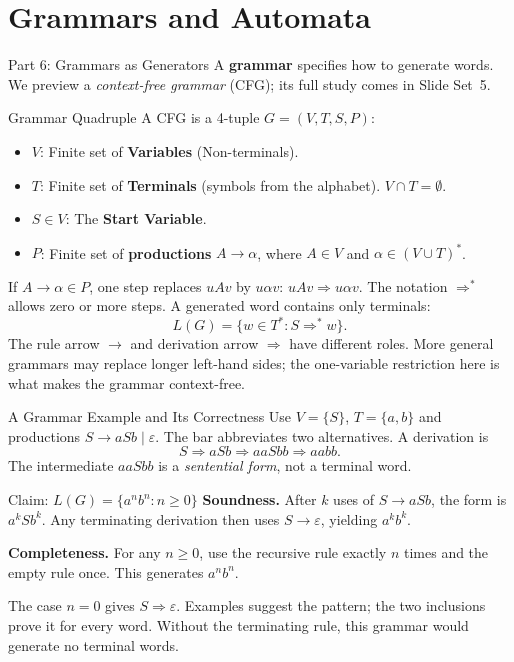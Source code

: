 \documentclass[10pt]{beamer}
\begin{document}
\section{Grammars and Automata}

\begin{frame}{Part 6: Grammars as Generators}
  \small
  A \textbf{grammar} specifies how to generate words. We preview a
  \emph{context-free grammar} (CFG); its full study comes in Slide Set~5.
  \pause
  \begin{block}{Grammar Quadruple}
    A CFG is a 4-tuple $G=(V,T,S,P)$:
    \begin{itemize}
        \item $V$: Finite set of \textbf{Variables} (Non-terminals).
        \item $T$: Finite set of \textbf{Terminals} (symbols from the alphabet). $V \cap T = \emptyset$.
        \item $S \in V$: The \textbf{Start Variable}.
        \item $P$: Finite set of \textbf{productions} $A\to\alpha$, where
          $A\in V$ and $\alpha\in(V\cup T)^*$.
    \end{itemize}
  \end{block}
  \pause
  If $A\to\alpha\in P$, one step replaces $uAv$ by $u\alpha v$:
  $uAv\Rightarrow u\alpha v$. The notation $\Rightarrow^*$ allows zero
  or more steps. A generated word contains only terminals:
  \[
    L(G)=\{w\in T^*:S\Rightarrow^*w\}.
  \]
  The rule arrow $\to$ and derivation arrow $\Rightarrow$ have different roles.
  More general grammars may replace longer left-hand sides; the one-variable
  restriction here is what makes the grammar context-free.
\end{frame}

\begin{frame}{A Grammar Example and Its Correctness}
  \small
  Use $V=\{S\}$, $T=\{a,b\}$ and productions $S\to aSb\mid\varepsilon$.
  The bar abbreviates two alternatives. A derivation is
  \[
    S\Rightarrow aSb\Rightarrow aaSbb\Rightarrow aabb.
  \]
  The intermediate $aaSbb$ is a \emph{sentential form}, not a terminal word.
  \pause
  \begin{block}{Claim: $L(G)=\{a^n b^n:n\ge0\}$}
    \textbf{Soundness.} After $k$ uses of $S\to aSb$, the form is $a^kSb^k$.
    Any terminating derivation then uses $S\to\varepsilon$, yielding $a^kb^k$.
    \par\smallskip
    \textbf{Completeness.} For any $n\ge0$, use the recursive rule exactly
    $n$ times and the empty rule once. This generates $a^nb^n$.
  \end{block}
  \pause
  The case $n=0$ gives $S\Rightarrow\varepsilon$.
  Examples suggest the pattern; the two inclusions prove it for every word.
  Without the terminating rule, this grammar would generate no terminal words.
\end{frame}
\end{document}
